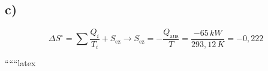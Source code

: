 

\subsection*{c)}

\[
\Delta S^{\circ} = \sum \frac{Q_i}{T_i} + S_{\text{ez}} \rightarrow S_{\text{ez}} = -\frac{Q_{\text{aus}}}{T} = \frac{-65\,kW}{293,12\,K} = -0,222
\]

``````latex